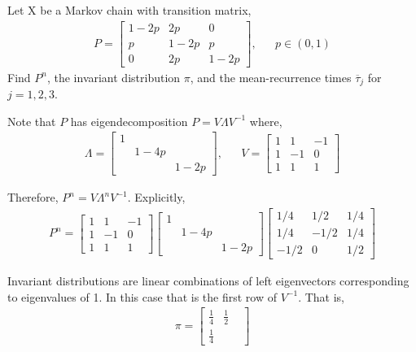 \documentclass[10pt]{article}
\begin{document}
\begin{problem}[Exercise 4.5]
Let X be a Markov chain with transition matrix,
\begin{align*}
    P = \left[\begin{array}{ccc}1-2p & 2p & 0 \\ p & 1-2p & p \\ 0 & 2p & 1-2p\end{array}\right], && p\in(0,1)
\end{align*}
    Find \( P^n \), the invariant distribution \( \pi \), and the mean-recurrence times \( \overline{\tau}_j \) for \( j=1,2,3 \).
\end{problem}

\begin{solution}[Solution]
    Note that \( P \) has eigendecomposition \( P = V\Lambda V^{-1} \) where,
    \begin{align*}
        \Lambda =
        \left[\begin{array}{rrr}1 \\ &1-4p \\ && 1-2p\end{array}\right]
        ,&&
        V = \left[\begin{array}{rrr} 1 & 1 & -1 \\ 1 & -1 & 0 \\ 1 & 1 & 1\end{array}\right]
    \end{align*}
    
    Therefore, \( P^n = V\Lambda^n V^{-1} \). Explicitly,
    \begin{align*}
        P^n = 
        \left[\begin{array}{rrr} 1 & 1 & -1 \\ 1 & -1 & 0 \\ 1 & 1 & 1\end{array}\right]
        \left[\begin{array}{rrr}1 \\ &1-4p \\ && 1-2p\end{array}\right]
        \left[\begin{array}{rrr}1/4 & 1/2 & 1/4 \\ 1/4 & -1/2 & 1/4 \\ -1/2 & 0 & 1/2\end{array}\right]
    \end{align*}
    
    Invariant distributions are linear combinations of left eigenvectors corresponding to eigenvalues of 1. In this case that is the first row of \( V^{-1} \). That is,
    \begin{align*}
        \pi = \left[\begin{array}{rrr}\frac{1}{4} & \frac{1}{2} & \\ \frac{1}{4}\end{array}\right]
    \end{align*}


\end{solution}
\end{document}
